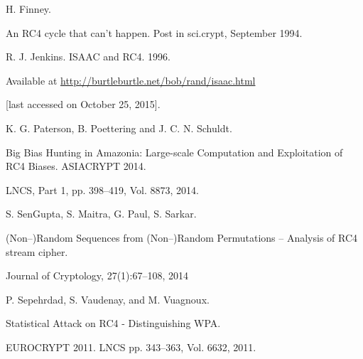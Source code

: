 \documentclass{llncs}
\begin{document}
\begin{thebibliography}{10}




H. Finney. 

An RC4 cycle that can't happen. Post in sci.crypt, September 1994.




R. J. Jenkins. ISAAC and RC4. 1996. 

Available at \url{http://burtleburtle.net/bob/rand/isaac.html} 

[last accessed on October 25, 2015].




K. G. Paterson, B. Poettering and J. C. N. Schuldt. 

Big Bias Hunting in Amazonia: Large-scale Computation and Exploitation of RC4 Biases. ASIACRYPT 2014. 

LNCS, Part 1, pp. 398--419, Vol. 8873, 2014.




S. SenGupta, S. Maitra, G. Paul, S. Sarkar.

(Non--)Random Sequences from (Non--)Random Permutations -- Analysis of RC4 stream cipher.

Journal of Cryptology, 27(1):67--108, 2014




P. Sepehrdad, S. Vaudenay, and M. Vuagnoux. 

Statistical Attack on RC4 - Distinguishing WPA.

EUROCRYPT 2011. LNCS pp. 343--363, Vol. 6632, 2011.



\end{thebibliography}
\end{document}
